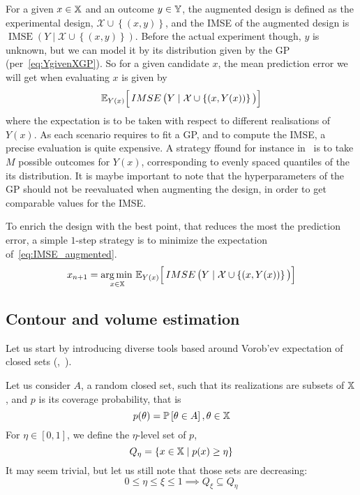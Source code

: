 \documentclass[../../Main_ManuscritThese.tex]{subfiles}
\newcommand{\IMSE}{\mathop{IMSE}}
\begin{document}
For a given $x\in \mathbb{X}$ and an outcome $y\in\mathbb{Y}$, the augmented design is defined as the experimental design, $\mathcal{X} \cup \left\{(x, y)\right\}$, and the IMSE of the augmented design is $\IMSE\left(Y \mid \mathcal{X} \cup \left\{(x, y)\right\} \right)$. Before the actual experiment though, $y$ is unknown, but we can model it by its distribution given by the GP (per~\cref{eq:YgivenXGP}). So for a given candidate $x$, the mean prediction error we will get when evaluating $x$ is given by
\begin{equation}
  \label{eq:IMSE_augmented}
  \Ex_{Y(x)}\Big[\IMSE\big(Y \mid \mathcal{X} \cup \left\{(x, Y(x))\right\} \big)\Big]
\end{equation}
where the expectation is to be taken with respect to different realisations of $Y(x)$. As each scenario requires to fit a GP, and to compute the IMSE, a precise evaluation is quite expensive. A strategy ffound for instance in~\cite{villemonteix_informational_2006} is to take $M$ possible outcomes for $Y(x)$, corresponding to evenly spaced quantiles of the its distribution.
It is maybe important to note that the hyperparameters of the GP should not be reevaluated when augmenting the design, in order to get comparable values for the IMSE.

To enrich the design with the best point, that reduces the most the prediction error, a simple $1$-step strategy is to minimize the expectation of~\cref{eq:IMSE_augmented}.
\begin{equation}
  x_{n+1} = \argmin_{x\in \Xspace}\Ex_{Y(x)}\Big[\IMSE\big(Y \mid \mathcal{X} \cup \left\{(x, Y(x))\right\} \big)\Big]
\end{equation}



\subsection{Contour and volume estimation}
Let us start by introducing diverse tools based around Vorob'ev expectation of closed sets (\cite{el_amri_analyse_2019},~\cite{heinrich_level_2012}). 


Let us consider $A$, a random closed set, such that its realizations are subsets of $\mathbb{X}$, and $p$ is its coverage probability, that is
\begin{equation}
  p(\theta) = \mathbb{P}\left[\theta\in A\right], \theta\in\mathbb{X}
\end{equation}
For $\eta \in [0, 1]$, we define the $\eta$-level set of $p$,
\begin{equation}
  Q_{\eta} = \{x\in\mathbb{X} \mid p(x) \geq \eta \}
\end{equation}
It may seem trivial, but let us still note that those sets are decreasing:
\begin{equation}
  0\leq \eta \leq \xi \leq 1 \implies Q_{\xi} \subseteq Q_{\eta}
\end{equation}
\end{document}
